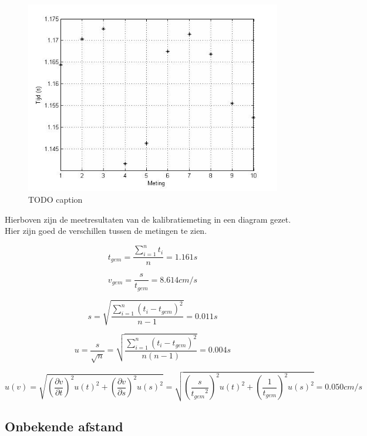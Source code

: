 \documentclass{report}
\begin{document}
\begin{figure}
\begin{center}
\includegraphics[width=150mm] {grafiekmeetresultaten3.jpg}
\caption{TODO caption}
\end{center}
\end{figure}
Hierboven zijn de meetresultaten van de kalibratiemeting in een diagram gezet. Hier zijn goed de verschillen tussen de metingen te zien.

$$ t_{gem}=\frac{\sum_{i=1}^{n}t_i}{n} = 1.161 s$$

$$ v_{gem} = \frac{s}{t_{gem}} = 8.614 cm/s$$

$$ s = \sqrt{\frac{\sum_{i=1}^{n}( t_i-t_{gem})^2}{n-1}} = 0.011 s$$

$$ u = \frac{s}{\sqrt{n}} = \sqrt{\frac{\sum_{i=1}^{n}( t_i-t_{gem})^2}{n(n-1)}} = 0.004 s$$

$$ u(v) = \sqrt{\left (\frac{\partial v }{\partial t }\right)^2 u(t)^2 + \left (\frac{\partial v }{\partial s }\right)^2 u(s)^2} = \sqrt{\left (\frac{s}{{t_{gem}}^2 }\right)^2 u(t)^2 + \left (\frac{1}{t_{gem} }\right)^2 u(s)^2} =0.050 cm/s$$

\subsection*{Onbekende afstand}
\end{document}

